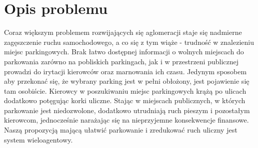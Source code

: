 \newpage
\section{Opis problemu}

Coraz większym problemem rozwijających się aglomeracji staje się nadmierne zagęszczenie ruchu samochodowego, a co się z tym wiąże - trudność w znalezieniu miejsc parkingowych. Brak łatwo dostępnej informacji o wolnych miejscach do parkowania zarówno na pobliskich parkingach, jak i w przestrzeni publicznej prowadzi do irytacji kierowców oraz marnowania ich czasu. Jedynym sposobem aby przekonać się, że wybrany parking jest w pełni obłożony, jest pojawienie się tam osobiście. Kierowcy w poszukiwaniu miejsc parkingowych krążą po ulicach dodatkowo potęgując korki uliczne. Stając w miejscach publicznych, w których parkowanie jest niedozwolone, dodatkowo utrudniają ruch pieszym i pozostałym kierowcom, jednocześnie narażając się na nieprzyjemne konsekwencje finansowe. Naszą propozycją mającą ułatwić parkowanie i zredukować ruch uliczny jest system wieloagentowy.